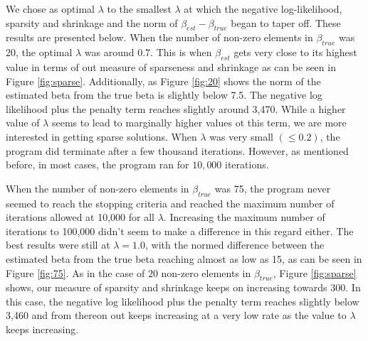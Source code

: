 \documentclass[12pt, leqno]{article}
\begin{document}
We chose as optimal $\lambda$ to the smallest $\lambda$ at which the
negative log-likelihood, sparsity and shrinkage and the norm of
$\beta_{est} - \beta_{true}$ began to taper off. These results
are presented below. When the number of non-zero elements in
$\beta_{true}$ was 20, the optimal $\lambda$ was around 0.7.  This is 
when $\beta_{est}$ gets very close to its highest value in terms of out measure
of sparseness and shrinkage as can be seen in Figure
\ref{fig:sparse}. Additionally, as Figure \ref{fig:20} shows the norm
of the estimated beta from the true beta is slightly below 7.5. The negative log likelihood plus the
penalty term reaches slightly around 3,470. While a higher value of
$\lambda$ seems to lead to marginally higher values ot this term, we
are more interested in getting sparse solutions.  When $\lambda$ was
very small $(\leq 0.2)$, the program did terminate after a few
thousand iterations. However, as mentioned before, in most cases, the
program ran for $10,000$ iterations. 

When the number of non-zero elements in $\beta_{true}$ was 75, the
program never seemed to reach the stopping criteria and reached the
maximum number of iterations allowed at 10,000 for all $\lambda$. Increasing the maximum
number of iterations to 100,000 didn't seem to make a difference in
this regard either. The best results were still at $\lambda = 1.0$,
with the normed difference between the estimated beta from the true
beta reaching almost as low as 15, as can be
seen in Figure \ref{fig:75}. As in the case of $20$ non-zero elements
in $\beta_{true}$, Figure \ref{fig:sparse}
shows, our measure of sparsity and shrinkage keeps on increasing
towards 300. In this case, the negative log likelihood plus the
penalty term reaches slightly below 3,460 and from thereon out keeps
increasing at a very
low rate as the value to $\lambda$ keeps increasing.
\end{document}
